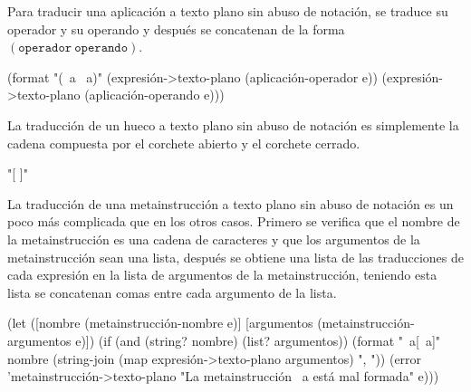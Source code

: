 \documentclass[letterpaper,twoside,openright,11pt]{book}
\begin{document}
Para traducir una aplicación a texto plano sin abuso de notación, se traduce su operador y su operando y después se concatenan de la forma \( (\mathtt{operador}\ \mathtt{operando}) \).

\nwenddocs{}\endmoddef
(format "(~a ~a)"
        (expresión->texto-plano (aplicación-operador e))
        (expresión->texto-plano (aplicación-operando e)))
\nwendcode{}\nwdocspar

La traducción de un hueco a texto plano sin abuso de notación es simplemente la cadena compuesta por el corchete abierto y el corchete cerrado.

\nwenddocs{}\endmoddef
"[ ]"
\nwendcode{}\nwdocspar

La traducción de una metainstrucción a texto plano sin abuso de notación es un poco más complicada que en los otros casos. Primero se verifica que el nombre de la metainstrucción es una cadena de caracteres y que los argumentos de la metainstrucción sean una lista, después se obtiene una lista de las traducciones de cada expresión en la lista de argumentos de la metainstrucción, teniendo esta lista se concatenan comas entre cada argumento de la lista.

\nwenddocs{}\endmoddef
(let ([nombre     (metainstrucción-nombre     e)]
      [argumentos (metainstrucción-argumentos e)])
  (if (and (string? nombre) (list? argumentos))
      (format "~a[~a]"
              nombre
              (string-join (map expresión->texto-plano argumentos) ", "))
      (error 'metainstrucción->texto-plano
             "La metainstrucción ~a está mal formada" e)))
\nwendcode{}\nwdocspar
\end{document}
